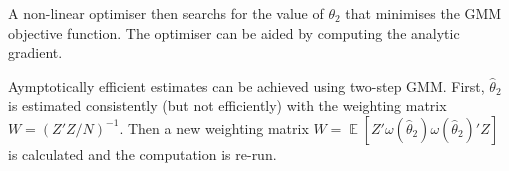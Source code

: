 \documentclass[parskip=half]{scrartcl}
\DeclareMathOperator{\E}{\mathbb{E}}
\begin{document}
A non-linear optimiser then searchs for the value of \(\theta_2\) that minimises the GMM objective function. The optimiser can be aided by computing the analytic gradient.

Aymptotically efficient estimates can be achieved using two-step GMM. First, \(\hat{\theta}_2\) is estimated consistently (but not efficiently) with the weighting matrix \(W = (Z'Z/N)^{-1}\). Then a new weighting matrix \(W = \E[Z'\omega(\hat{\theta}_2)\omega(\hat{\theta}_2)'Z]\) is calculated and the computation is re-run.
\end{document}
